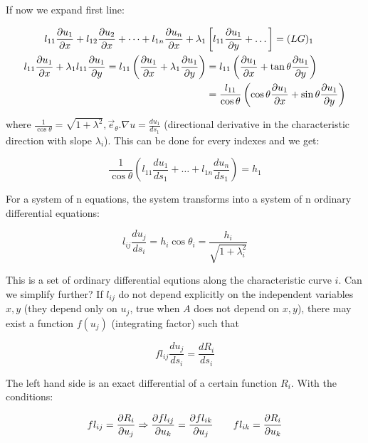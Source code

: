 If now we expand first line: 

\begin{equation}
\begin{aligned}
l_{11} \frac{\partial u_1}{\partial x} + l_{12} \frac{\partial u_2}{\partial x} + \dots + l_{1n} \frac{\partial u_n}{\partial x} + \lambda_1 &\left[ l_{11} \frac{\partial u_1}{\partial y} + \dots \right] = (LG)_1 \\
l_{11} \frac{\partial u_1}{\partial x} + \lambda_1 l_{11} \frac{\partial u_1}{\partial y} = l_{11} \left( \frac{\partial u_1}{\partial x} + \lambda_1 \frac{\partial u_1}{\partial y}\right) &= l_{11} \left( \frac{\partial u_1}{\partial x} + \tan \theta \frac{\partial u_1}{\partial y}\right) \\
&= \frac{l_{11}}{\cos \theta} \left(\cos \theta \frac{\partial u_1}{\partial x} + \sin \theta\frac{\partial u_1}{\partial y}\right)
\end{aligned}
\end{equation}

where $\frac{1}{\cos \theta} = \sqrt{1+\lambda ^2}, \vec{e}_\theta .\nabla u = \frac{du_1}{ds_1}$ (directional derivative in the characteristic direction with slope $\lambda _i$). This can be done for every indexes and we get: 

\begin{equation}
\frac{1}{\cos \theta} \left( l_{11} \frac{du_1}{ds_1} + \dots + l_{1n}\frac{du_n}{ds_1} \right) = h_1
\end{equation}

For a system of n equations, the system transforms into a system of n ordinary differential equations: 

\begin{equation}
l_{ij} \frac{d u_j}{ds_{i}} = h_i \cos \theta _i = \frac{h_i}{\sqrt{1+\lambda ^2_i}}
\end{equation} 

This is a set of ordinary differential equtions along the characteristic curve $i$. Can we simplify further? If $l_{ij}$ do not depend explicitly on the independent variables $x,y$ (they depend only on $u_j$, true when $A$ does not depend on $x,y$), there may exist a function $f(u_j)$ (integrating factor) such that 

\begin{equation}
fl_{ij} \frac{du_j}{ds_i} = \frac{dR_i}{ds_i}
\end{equation}

The left hand side is an exact differential of a certain function $R_i$. With the conditions: 

\begin{equation}
fl_{ij} = \frac{\partial R_i}{\partial u_j} \Rightarrow \frac{\partial fl_{ij}}{\partial u_k} = \frac{\partial fl_{ik}}{\partial u_j} \qquad fl_{ik} = \frac{\partial R_i}{\partial u_k}
\end{equation}


